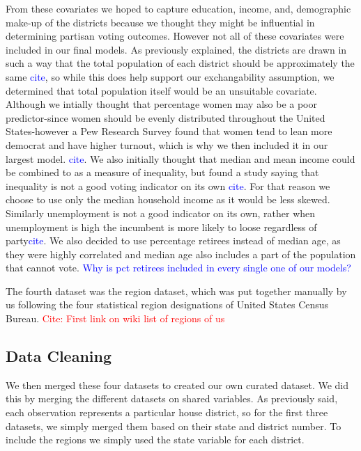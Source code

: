 \documentclass[12pt]{article}
\newcommand{\blue}[1]{\textcolor{blue}{#1}}
\begin{document}
From these covariates we hoped to capture education, income, and, demographic make-up  of the districts because we thought they might be influential in determining partisan voting outcomes. However not all of these covariates were included in our final models. As previously explained, the districts are drawn in such a way that the total population of each district should be approximately the same \blue{cite}, so while this does help support our exchangability assumption, we determined that total population itself would be an unsuitable covariate. Although we intially thought that percentage women may also be a poor predictor-since women should be evenly distributed throughout the United States-however a Pew Research Survey found that women tend to lean more democrat and have higher turnout, which is why we then included it in our largest model. \blue{cite}. We also initially thought that median and mean income could be combined to as a measure of inequality, but found a study saying that inequality is not a good voting indicator on its own \blue{cite}. For that reason we choose to use only the median household income as it would be less skewed. Similarly unemployment is not a good indicator on its own, rather when unemployment is high the incumbent is more likely to loose regardless of party\blue{cite}.  We also decided to use percentage retirees instead of median age, as they were highly correlated and median age also includes a part of the population that cannot vote. 
\blue{ Why is pct retirees included in every single one of our models? }


The fourth dataset was the region dataset, which was put together manually by us following the four statistical region designations of United States Census Bureau. \textcolor{red}{Cite: First link on wiki list of regions of us }


\subsection*{Data Cleaning}

We then merged these four datasets to created our own curated dataset. We did this by merging the different datasets on shared variables. As previously said, each observation represents a particular house district, so for the first three datasets, we simply merged them based on their state and district number. To include the regions we simply used the state variable for each district. 
\end{document}
